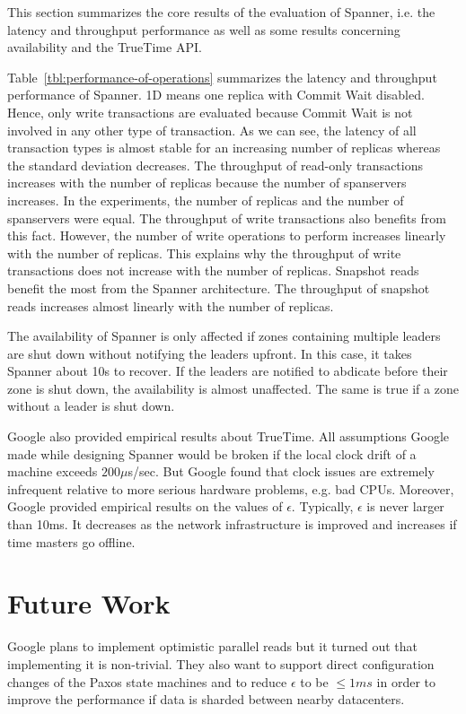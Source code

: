 \documentclass[onecolumn, a4paper, 10pt]{article}
\begin{document}
This section summarizes the core results of the evaluation of Spanner, i.e. the
latency and throughput performance as well as some results concerning availability
and the TrueTime API.

Table~\ref{tbl:performance-of-operations} summarizes the latency and throughput
performance of Spanner. 1D means one replica with Commit Wait disabled. Hence,
only write transactions are evaluated because Commit Wait is not involved in any
other type of transaction. As we can see, the latency of all transaction types is
almost stable for an increasing number of replicas whereas the standard deviation
decreases. The throughput of read-only transactions increases with the number of
replicas because the number of spanservers increases. In the experiments, the
number of replicas and the number of spanservers were equal. The throughput of write
transactions also benefits from this fact. However, the number of write operations
to perform increases linearly with the number of replicas. This explains why the
throughput of write transactions does not increase with the number of replicas.
Snapshot reads benefit the most from the Spanner architecture. The throughput of
snapshot reads increases almost linearly with the number of replicas. 

The availability of Spanner is only affected if zones containing multiple leaders
are shut down without notifying the leaders upfront. In this case, it takes Spanner
about 10s to recover. If the leaders are notified to abdicate before their zone
is shut down, the availability is almost unaffected. The same is true if a zone
without a leader is shut down.

Google also provided empirical results about TrueTime. All assumptions Google
made while designing Spanner would be broken if the local clock drift of a machine
exceeds $200\mu$s/sec. But Google found that clock issues are extremely infrequent
relative to more serious hardware problems, e.g. bad CPUs. Moreover, Google
provided empirical results on the values of $\epsilon$. Typically, $\epsilon$ is
never larger than 10ms. It decreases as the network infrastructure is improved
and increases if time masters go offline.

\section{Future Work}
\label{sec:future-work}

Google plans to implement optimistic parallel reads but it turned out that
implementing it is non-trivial. They also want to support direct configuration
changes of the Paxos state machines and to reduce $\epsilon$ to be $\leq 1ms$ in
order to improve the performance if data is sharded between nearby datacenters.
\end{document}
